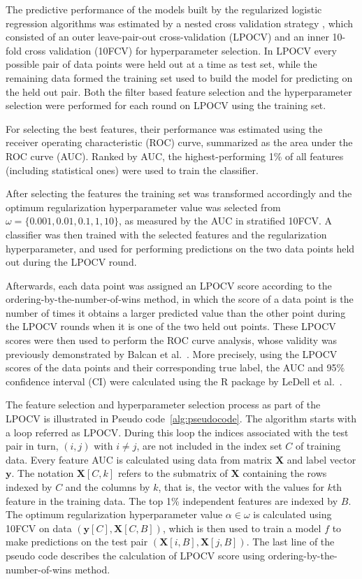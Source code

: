 \documentclass[10pt,letterpaper]{article}
\newcommand{\indx}{B}
\renewcommand{\vec}[1]{\mathbf{#1}}  %
\newcommand{\citep}{\cite}
\begin{document}
The predictive performance of the models built by the regularized logistic
regression algorithms was estimated by a nested cross validation strategy
\citep{Varma2006}, which consisted of an outer leave-pair-out cross-validation
(LPOCV) \citep{Airola2011} and an inner 10-fold cross validation (10FCV) for
hyperparameter selection. In LPOCV every possible pair of data points were held
out at a time as test set, while the remaining data formed the training set used
to build the model for predicting on the held out pair. Both the filter based
feature selection and the hyperparameter selection were performed for each
round on LPOCV using the training set.

For selecting the best features, their performance was estimated using the
receiver operating characteristic (ROC) curve, summarized as the area under the
ROC curve (AUC). Ranked by AUC, the highest-performing 1\% of all features
(including statistical ones) were used to train the classifier.

After selecting the features the training set was transformed accordingly and
the optimum regularization hyperparameter value was selected from $\omega =
\{0.001, 0.01, 0.1, 1, 10\}$, as measured by the AUC in stratified 10FCV\@. A
classifier was then trained with the selected features and the regularization
hyperparameter, and used for performing predictions on the two data points held
out during the LPOCV round.

Afterwards, each data point was assigned an LPOCV score according to the
ordering-by-the-number-of-wins method, in which the score of a data point is the
number of times it obtains a larger predicted value than the other point during
the LPOCV rounds when it is one of the two held out points. These LPOCV scores
were then used to perform the ROC curve analysis, whose validity was previously
demonstrated by Balcan et al.\ \cite{Balcan2008}. More precisely, using the
LPOCV scores of the data points and their corresponding true label, the AUC and
95\% confidence interval (CI) were calculated using the R package by LeDell et
al.\ \cite{LeDell2015}.

The feature selection and hyperparameter selection process as part of the LPOCV
is illustrated in Pseudo code~\ref{alg:pseudocode}. The algorithm starts with a
loop referred as LPOCV\@. During this loop the indices associated with the test
pair in turn, $(i,j)$ with $i \neq j$, are not included in the index set $C$ of
training data. Every feature AUC is calculated using data from matrix $\vec{X}$
and label vector $\vec{y}$. The notation $\vec{X}[C,k]$ refers to the submatrix
of $\vec{X}$ containing the rows indexed by $C$ and the columns by $k$, that is,
the vector with the values for $k$th feature in the training data. The top 1\%
independent features are indexed by $\indx$. The optimum regularization
hyperparameter value $\alpha \in \omega$ is calculated using 10FCV on data
$(\vec{y}[C], \vec{X}[C,\indx])$, which is then used to train a model $f$ to
make predictions on the test pair $(\vec{X}[i,\indx], \vec{X}[j,\indx])$. The
last line of the pseudo code describes the calculation of LPOCV score using
ordering-by-the-number-of-wins method.
\end{document}
